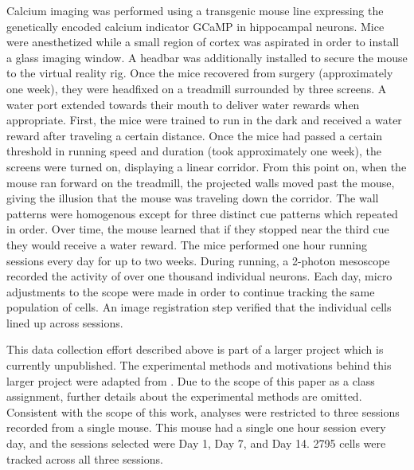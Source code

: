 \documentclass[preprint]{aastex701}
\begin{document}
Calcium imaging was performed using a transgenic mouse line expressing the genetically encoded calcium indicator GCaMP in hippocampal neurons. Mice were anesthetized while a small region of cortex was aspirated in order to install a glass imaging window. A headbar was additionally installed to secure the mouse to the virtual reality rig. Once the mice recovered from surgery (approximately one week), they were headfixed on a treadmill surrounded by three screens. A water port extended towards their mouth to deliver water rewards when appropriate. First, the mice were trained to run in the dark  and received a water reward after traveling a certain distance. Once the mice had passed a certain threshold in running speed and duration (took approximately one week), the screens were turned on, displaying a linear corridor. From this point on, when the mouse ran forward on the treadmill, the projected walls moved past the mouse, giving the illusion that the mouse was traveling down the corridor. The wall patterns were homogenous except for three distinct cue patterns which repeated in order. Over time, the mouse learned that if they stopped near the third cue they would receive a water reward. The mice performed one hour running sessions every day for up to two weeks. During running, a 2-photon mesoscope recorded the activity of over one thousand individual neurons. Each day, micro adjustments to the scope were made in order to continue tracking the same population of cells. An image registration step verified that the individual cells lined up across sessions.  

This data collection effort described above is part of a larger project which is currently unpublished. The experimental methods and motivations behind this larger project were adapted from \citet{sun2025osm}. Due to the scope of this paper as a class assignment, further details about the experimental methods are omitted. Consistent with the scope of this work, analyses were restricted to three sessions recorded from a single mouse. This mouse had a single one hour session every day, and the sessions selected were Day 1, Day 7, and Day 14. 2795 cells were tracked across all three sessions.
\end{document}
